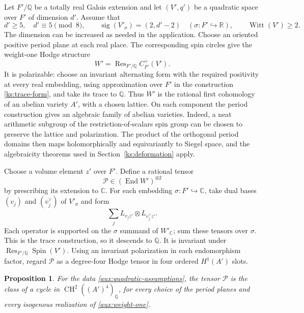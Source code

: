 \documentclass[11pt]{article}
\numberwithin{equation}{section}
\newtheorem{proposition}[theorem]{Proposition}
\theoremstyle{definition}
\theoremstyle{remark}
\newcommand{\Q}{\mathbb Q}
\newcommand{\R}{\mathbb R}
\newcommand{\C}{\mathbb C}
\DeclareMathOperator{\End}{End}
\DeclareMathOperator{\Spin}{Spin}
\DeclareMathOperator{\CH}{CH}
\begin{document}
Let $F'/\Q$ be a totally real Galois extension and let
$(V',q')$ be a quadratic space over $F'$ of dimension $d'$.
Assume that
\begin{equation}
 \label{aux:quadratic-assumptions}
 d'\ge5,\quad d'\equiv5\pmod8,\qquad
 \operatorname{sig}(V'_\sigma)=(2,d'-2)
       \quad(\sigma:F'\hookrightarrow\R),\qquad
 \operatorname{Witt}(V')\ge2.
\end{equation}
The dimension can be increased as needed in the
application.  Choose an
oriented positive period plane at each real place.  The
corresponding spin circles give the weight-one Hodge
structure
\begin{equation}
 \label{aux:weight-one}
 W'=\operatorname{Res}_{F'/\Q}C^+_{F'}(V').
\end{equation}
It is polarizable: choose an invariant alternating form
with the required positivity at every real embedding,
using approximation over $F'$ in the construction
\eqref{ks:trace-form}, and take its trace to $\Q$.
Thus $W'$ is the rational first cohomology of an abelian
variety $A'$, with a chosen lattice.  On each component
the period construction gives an algebraic family of
abelian varieties.  Indeed, a neat arithmetic subgroup
of the restriction-of-scalars spin group can be chosen
to preserve the lattice and polarization.  The product
of the orthogonal period domains then maps
holomorphically and equivariantly to Siegel space, and
the algebraicity theorems used in
Section~\ref{ks:deformation} apply.

Choose a volume element $z'$ over $F'$.  Define a
rational tensor
\begin{equation}
 \label{aux:P}
 \mathcal P\in(\End W')^{\otimes2}
\end{equation}
by prescribing its extension to $\C$.  For each embedding
$\sigma:F'\hookrightarrow\C$, take dual bases
$(v_j)$ and $(v_j^\vee)$ of $V'_\sigma$ and form
\[
 \sum_jL_{v_jz'}\otimes L_{v_j^\vee z'}.
\]
Each operator is supported on the $\sigma$ summand of
$W'_\C$; sum these tensors over $\sigma$.  This is the
trace construction, so it descends to $\Q$.  It is
invariant under $\operatorname{Res}_{F'/\Q}\Spin(V')$.
Using an invariant polarization in each endomorphism
factor, regard $\mathcal P$ as a degree-four Hodge
tensor in four ordered $H^1(A')$ slots.

\begin{proposition}
 \label{prop:auxiliary-spin}
For the data \eqref{aux:quadratic-assumptions}, the tensor
$\mathcal P$ is the class of a cycle in
$\CH^2((A')^4)_{\Q}$, for every choice of the period planes and
every isogenous realization of \eqref{aux:weight-one}.
\end{proposition}
\end{document}
